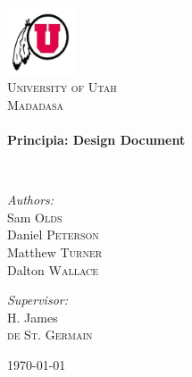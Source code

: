 \begin{titlepage}
\begin{center}

\includegraphics[width=0.15\textwidth]{img/logo}~\\[1 cm]

\textsc{\LARGE University of Utah}\\[1.5 cm]

\textsc{\Large Madadasa}\\[1.5 cm]

\HRule \\[0.4 cm]
{  \huge \bfseries Principia: Design Document
	\\[0.4 cm]}

\HRule \\[1.5 cm]

\noindent
\begin{minipage}{0.4\textwidth}
\begin{flushleft} \large
\emph{Authors:}\\
Sam \textsc{Olds}\\
Daniel \textsc{Peterson}\\
Matthew \textsc{Turner} \\
Dalton \textsc{Wallace}\\
\end{flushleft}
\end{minipage}%
\begin{minipage}{0.4\textwidth}
\begin{flushright} \large
\emph{Supervisor:} \\
H. James \\ \textsc{de St. Germain}
\end{flushright}
\end{minipage}

\vfill

{\large \today}

\end{center}
\end{titlepage}